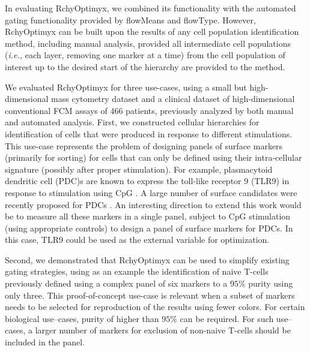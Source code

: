 
In evaluating  RchyOptimyx, we  combined its functionality with the
automated gating functionality provided by flowMeans and flowType. 
However,  RchyOptimyx can be built upon the results of any cell  %
population identification method, including manual analysis, provided
all intermediate cell populations (\emph{i.e.,} each layer, removing one marker at a time) from the cell population of interest  up to the desired start of the hierarchy are provided to the method.

We evaluated RchyOptimyx for three use-cases, using a small but high-dimensional mass cytometry dataset and a clinical dataset of high-dimensional conventional FCM  assays of $466$ patients, previously analyzed by both manual and automated analysis.
First, we constructed cellular hierarchies for identification of cells that were produced in response to different stimulations.
This use-case represents the problem of designing panels of surface markers (primarily for sorting) for cells that can only be defined using their intra-cellular signature (possibly after proper stimulation). 
For example, plasmacytoid dendritic cell (PDC)s are known to express the toll-like receptor 9 (TLR9) in response to stimulation using CpG \cite{krug2001toll}. 
A large number of surface candidates were recently proposed for PDCs \cite{marafioti2008novel,swiecki2010unraveling,schuster2010co,cao2009molecular}.
An interesting direction to extend this work  would be to measure all these markers in a single panel, subject to CpG stimulation (using appropriate controls) to design a panel of surface markers for PDCs.
In this  case, TLR9 could be used as the external variable for optimization.

Second, we demonstrated that RchyOptimyx can be used to simplify existing gating strategies, using as an example the identification of naive T-cells previously defined using a complex panel of six markers to a $95\%$ purity using only three. 
This proof-of-concept use-case is relevant when a subset of markers needs to be selected for reproduction of the results using fewer colors.
For certain biological use--cases, purity of higher than $95\%$ can be required.
For such use--cases, a larger number of markers for exclusion of non-naive T-cells should be included in the panel.

